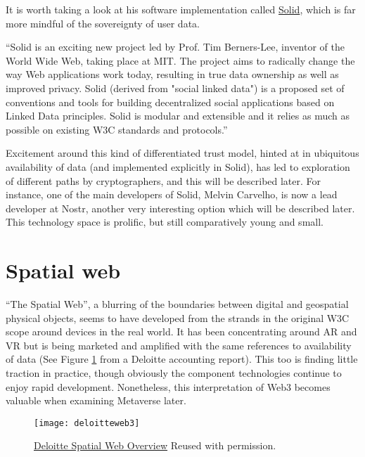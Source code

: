 It is worth taking a look at his software implementation called \href{https://solidproject.org}{Solid}, which is far more mindful of the sovereignty of user data.\par
``Solid is an exciting new project led by Prof. Tim Berners-Lee, inventor of the World Wide Web, taking place at MIT. The project aims to radically change the way Web applications work today, resulting in true data ownership as well as improved privacy. Solid (derived from "social linked data") is a proposed set of conventions and tools for building decentralized social applications based on Linked Data principles. Solid is modular and extensible and it relies as much as possible on existing W3C standards and protocols.'' \par
Excitement around this kind of differentiated trust model, hinted at in ubiquitous availability of data (and implemented explicitly in Solid), has led to exploration of different paths by cryptographers, and this will be described later. For instance, one of the main developers of Solid, Melvin Carvelho, is now a lead developer at Nostr, another very interesting option which will be described later. This technology space is prolific, but still comparatively young and small.\par
\section{Spatial web}
``The Spatial Web'', a blurring of the boundaries between digital and geospatial physical objects, seems to have developed from the strands in the original W3C scope around devices in the real world. It has been concentrating around AR and VR but is being marketed and amplified with the same references to availability of data (See Figure \ref{fig:deloitteSpatial} from a Deloitte accounting report). This too is finding little traction in practice, though obviously the component technologies continue to enjoy rapid development. Nonetheless, this interpretation of Web3 becomes valuable when examining Metaverse later.\par
\begin{figure}
  \centering
    \texttt{[image: deloitteweb3]}
  \caption{\href{https://www2.deloitte.com/us/en/insights/topics/digital-transformation/web-3-0-technologies-in-business.html}{Deloitte Spatial Web Overview} Reused with permission.}
  \label{fig:deloitteSpatial}
\end{figure}
